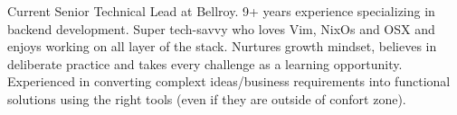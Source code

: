 

\begin{cvparagraph}

  Current Senior Technical Lead at Bellroy. 9+ years experience specializing in backend development. Super tech-savvy who loves Vim, NixOs and OSX and enjoys working on all layer of the stack. Nurtures growth mindset, believes in deliberate practice and takes every challenge as a learning opportunity. Experienced in converting complext ideas/business requirements into functional solutions using the right tools (even if they are outside of confort zone).
\end{cvparagraph}
